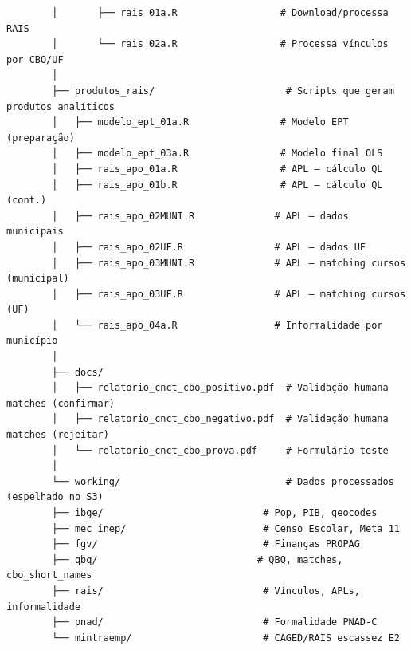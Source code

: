 \documentclass[10pt]{article}
\begin{document}
\begin{verbatim}
		│       ├── rais_01a.R                  # Download/processa RAIS
		│       └── rais_02a.R                  # Processa vínculos por CBO/UF
		│
		├── produtos_rais/                       # Scripts que geram produtos analíticos
		│   ├── modelo_ept_01a.R                # Modelo EPT (preparação)
		│   ├── modelo_ept_03a.R                # Modelo final OLS
		│   ├── rais_apo_01a.R                  # APL — cálculo QL
		│   ├── rais_apo_01b.R                  # APL — cálculo QL (cont.)
		│   ├── rais_apo_02MUNI.R              # APL — dados municipais
		│   ├── rais_apo_02UF.R                # APL — dados UF
		│   ├── rais_apo_03MUNI.R              # APL — matching cursos (municipal)
		│   ├── rais_apo_03UF.R                # APL — matching cursos (UF)
		│   └── rais_apo_04a.R                 # Informalidade por município
		│
		├── docs/
		│   ├── relatorio_cnct_cbo_positivo.pdf  # Validação humana matches (confirmar)
		│   ├── relatorio_cnct_cbo_negativo.pdf  # Validação humana matches (rejeitar)
		│   └── relatorio_cnct_cbo_prova.pdf     # Formulário teste
		│
		└── working/                             # Dados processados (espelhado no S3)
		├── ibge/                            # Pop, PIB, geocodes
		├── mec_inep/                        # Censo Escolar, Meta 11
		├── fgv/                             # Finanças PROPAG
		├── qbq/                            # QBQ, matches, cbo_short_names
		├── rais/                            # Vínculos, APLs, informalidade
		├── pnad/                            # Formalidade PNAD-C
		└── mintraemp/                       # CAGED/RAIS escassez E2
	\end{verbatim}
	
\end{document}
